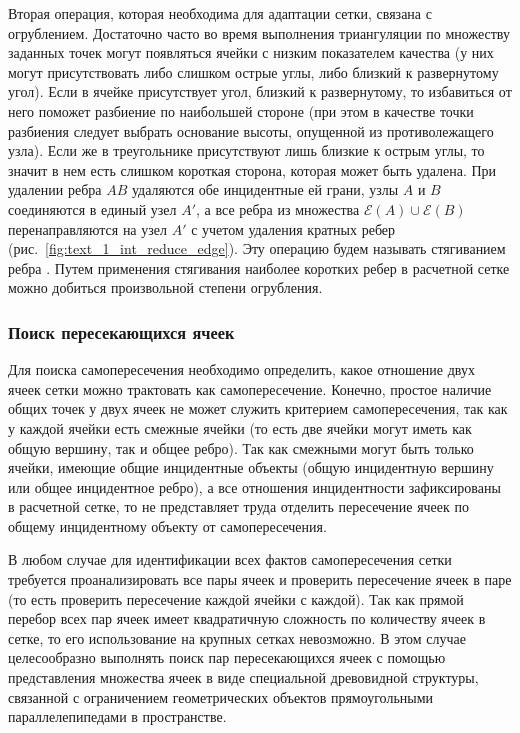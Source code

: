 Вторая операция, которая необходима для адаптации сетки, связана с огрублением.
Достаточно часто во время выполнения триангуляции по множеству заданных точек могут появляться ячейки с низким показателем качества (у них могут присутствовать либо слишком острые углы, либо близкий к развернутому угол).
Если в ячейке присутствует угол, близкий к развернутому, то избавиться от него поможет разбиение по наибольшей стороне (при этом в качестве точки разбиения следует выбрать основание высоты, опущенной из противолежащего узла).
Если же в треугольнике присутствуют лишь близкие к острым углы, то значит в нем есть слишком короткая сторона, которая может быть удалена.
При удалении ребра $AB$ удаляются обе инцидентные ей грани, узлы $A$ и $B$ соединяются в единый узел $A'$, а все ребра из множества $\mathscr{E}(A) \cup \mathscr{E}(B)$ перенаправляются на узел $A'$ с учетом удаления кратных ребер (рис.~\ref{fig:text_1_int_reduce_edge}).
Эту операцию будем называть стягиванием ребра \cite{Panchal2022Tri}.
Путем применения стягивания наиболее коротких ребер в расчетной сетке можно добиться произвольной степени огрубления.

\subsubsection{Поиск пересекающихся ячеек}

Для поиска самопересечения необходимо определить, какое отношение двух ячеек сетки можно трактовать как самопересечение.
Конечно, простое наличие общих точек у двух ячеек не может служить критерием самопересечения, так как у каждой ячейки есть смежные ячейки (то есть две ячейки могут иметь как общую вершину, так и общее ребро).
Так как смежными могут быть только ячейки, имеющие общие инцидентные объекты (общую инцидентную вершину или общее инцидентное ребро), а все отношения инцидентности зафиксированы в расчетной сетке, то не представляет труда отделить пересечение ячеек по общему инцидентному объекту от самопересечения.

В любом случае для идентификации всех фактов самопересечения сетки требуется проанализировать все пары ячеек и проверить пересечение ячеек в паре (то есть проверить пересечение каждой ячейки с каждой).
Так как прямой перебор всех пар ячеек имеет квадратичную сложность по количеству ячеек в сетке, то его использование на крупных сетках невозможно.
В этом случае целесообразно выполнять поиск пар пересекающихся ячеек с помощью представления множества ячеек в виде специальной древовидной структуры, связанной с ограничением геометрических объектов прямоугольными параллелепипедами в пространстве.


